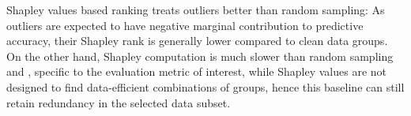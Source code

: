 Shapley values based ranking treats outliers better than random sampling: As outliers are expected to have negative marginal contribution to predictive accuracy, their Shapley rank is generally lower compared to clean data groups. On the other hand, Shapley computation is much slower than random sampling and \bcores, specific to the evaluation metric of interest, while Shapley values are not designed to find data-efficient combinations of groups, hence this baseline can still retain redundancy in the selected data subset.








